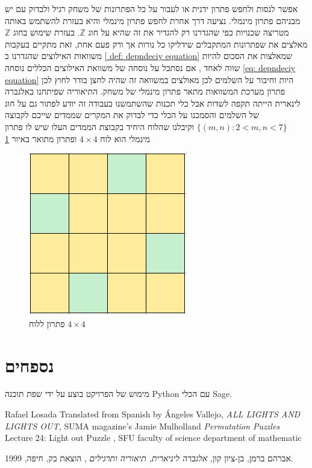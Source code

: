 \documentclass[12pt,leqno]{article}
\theoremstyle{theoremdd}
\begin{document}
אפשר לנסות ולחפש פתרון ידנית
או לעבור על כל הפתרונות של משחק רגיל ולבדוק עם יש מבניהם פתרון 
מינמלי.
נציעה דרך אחרת לחפש פתרון 
מינמלי
והיא בעזרת להשתמש באותה מטריצה שכנויות כפי שהגדרנו רק להגדיר 
את זה שהיא על חוג 
$\mathbb{Z}$.
בעזרת שימוש בחוג 
$\mathbb{Z}$
מאלצים את שפתרונות המתקבלים
שידליקו כל נורות אך ורק פעם אחת,
זאת מתקיים בעקבות 
משוואות האילוצים שהגדרנו ב
\ref{ def: depndeciy equation}
שמאלצות את הסכום להיות שווה לאחד
,
אם נסתכל על נוסחה של משוואת האילוצים הכללים 
נוסחה
\ref{eq: depndeciy equation}
היות וחיבור על השלמים לכן 
מאולצים במשוואה זה שהיה לחצן בודד לחוץ 
לכן פתרון מערכת המשוואות מתאר פתרון 
מינמלי של משחק.
התיאוריה שפיתחנו באלגברה לינארית הייתה תקפה לשדות 
אבל כלי תכנות שהשתמשנו
בעבודה זה יודע לפתור גם על חוג של השלמים 
והסמכנו על הכלי כדי לבדוק את המקרים
שממדים שייכם לקבוצה 
$\{ (m,n) : 2 < m,n <7 \}$
וקיבלנו שהלוח
היחיד בקבוצת הממדים העלו שיש לו פתרון מינמלי 
הוא
לוח 
$4 \times 4$
ופתרון מתואר באיור 
\ref{fig:4x4_have_min_sol}

\begin{figure}[ht]
    \caption{פתרון ללוח 
    $4 \times 4$}
    \label{fig:4x4_have_min_sol}
    \centering
    \includegraphics[width=.5\textwidth,height=.5\textheight,keepaspectratio]{images/4x4_min_sol.PNG}
\end{figure}

\newpage
\section{נספחים}
מימוש של הפרויקט בוצע על ידי 
שפת תוכנה 
{Python}
עם הכלי 
{Sage}.


\newpage
\begin{thebibliography}{99}
\begin{english}
Rafael Losada
Translated from Spanish by Ángeles Vallejo,
\emph{
    ALL LIGHTS AND LIGHTS OUT,
}
SUMA magazine’s 
Jamie Mulholland
\emph{
    Permutation Puzzles
}
Lecture 24: Light out Puzzle , SFU faculty of science department of mathematic
\end{english}
אברהם ברמן, בן-ציון קון, 
\emph{
אלגברה ליניארית, תיאוריה ותרגילים
}
, הוצאת בק, חיפה, 1999.
\end{thebibliography}
\end{document}
